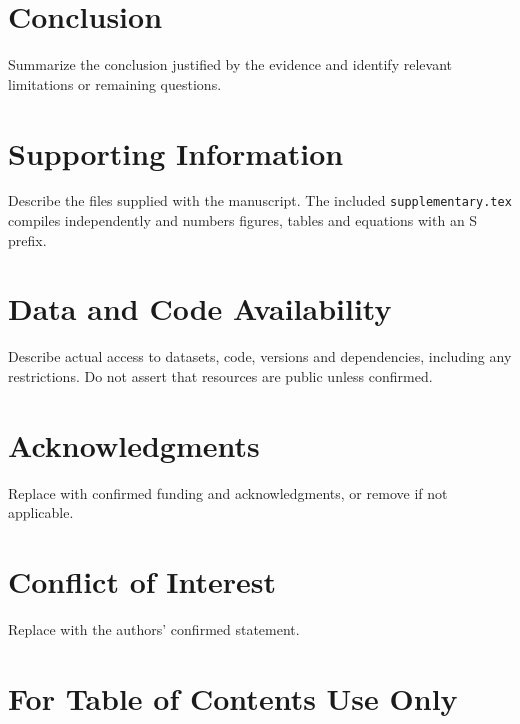 \documentclass[letterpaper,11pt]{article}
\begin{document}
\section{Conclusion}\label{sec:conclusion}
Summarize the conclusion justified by the evidence and identify relevant
limitations or remaining questions.

\section*{Supporting Information}
Describe the files supplied with the manuscript. The included
\texttt{supplementary.tex} compiles independently and numbers figures, tables
and equations with an S prefix.

\section*{Data and Code Availability}
Describe actual access to datasets, code, versions and dependencies, including
any restrictions. Do not assert that resources are public unless confirmed.
\section*{Acknowledgments}
Replace with confirmed funding and acknowledgments, or remove if not applicable.
\section*{Conflict of Interest}
Replace with the authors' confirmed statement.



\clearpage
\section*{For Table of Contents Use Only}
\begin{center}
\end{center}
\end{document}
